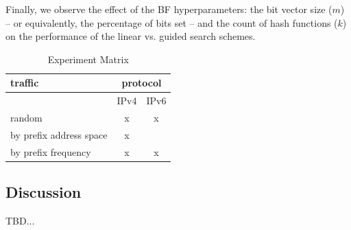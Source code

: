\documentclass[conference,compsoc]{IEEEtran}
\begin{document}
Finally, we observe the effect of the BF hyperparameters:
the bit vector size ($m$) -- or equivalently, the percentage of bits set -- 
and the count of hash functions ($k$) on the performance of the linear vs.
guided search schemes.

\begin{table}[]
\centering
\caption{Experiment Matrix} 
\label{tab:experiment-matrix}

\begin{tabular}{@{}lclcl@{}}
\toprule
traffic                 & \multicolumn{4}{c}{protocol}                        \\ \midrule
                        & \multicolumn{2}{c}{IPv4} & \multicolumn{2}{c}{IPv6} \\
random                  & \multicolumn{2}{c}{x}    & \multicolumn{2}{c}{x}    \\
by prefix address space & \multicolumn{2}{c}{x}    & \multicolumn{2}{c}{}     \\
by prefix frequency     & \multicolumn{2}{c}{x}    & \multicolumn{2}{c}{x}    \\ \bottomrule

\end{tabular}
\end{table}

\subsection{Discussion}

TBD...





\end{document}
